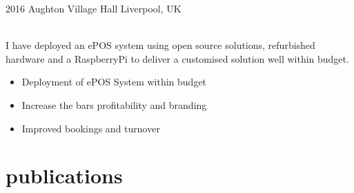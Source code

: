 \documentclass[]{cv-style}          %
\begin{document}
\begin{entrylist}
\entry
  {2016}
  {Aughton Village Hall}
  {Liverpool, UK}
  {\\{I have deployed an ePOS system using open source solutions, refurbished hardware and a RaspberryPi to deliver a customised solution well within budget.\\}
  \begin{itemize}
    \item Deployment of ePOS System within budget
    \item Increase the bars profitability and branding
    \item Improved bookings and turnover
  \end{itemize}
}
\end{entrylist}






\section{publications}
\begin{entrylist}
\end{entrylist}
\end{document}
